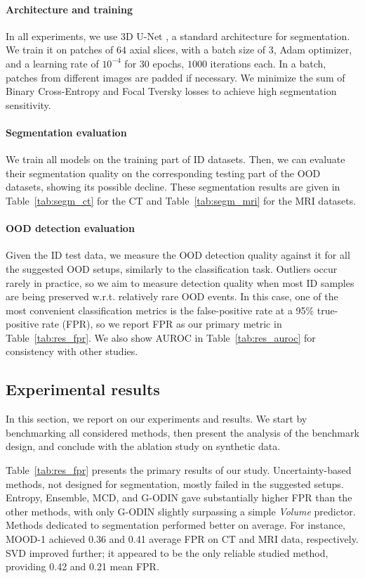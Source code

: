 \paragraph{Architecture and training} In all experiments, we use 3D U-Net \cite{isensee2018no}, a standard architecture for segmentation. We train it on patches of $64$ axial slices, with a batch size of $3$, Adam optimizer, and a learning rate of $10^{-4}$ for $30$ epochs, $1000$ iterations each. In a batch, patches from different images are padded if necessary. We minimize the sum of Binary Cross-Entropy and Focal Tversky losses \cite{abraham2019novel} to achieve high segmentation sensitivity.

\paragraph{Segmentation evaluation} We train all models on the training part of ID datasets. Then, we can evaluate their segmentation quality on the corresponding testing part of the OOD datasets, showing its possible decline. These segmentation results are given in Table~\ref{tab:segm_ct} for the CT and Table~\ref{tab:segm_mri} for the MRI datasets.

\paragraph{OOD detection evaluation} Given the ID test data, we measure the OOD detection quality against it for all the suggested OOD setups, similarly to the classification task. Outliers occur rarely in practice, so we aim to measure detection quality when most ID samples are being preserved w.r.t. relatively rare OOD events. In this case, one of the most convenient classification metrics is the false-positive rate at a 95\% true-positive rate (FPR), so we report FPR as our primary metric in Table~\ref{tab:res_fpr}. We also show AUROC in Table~\ref{tab:res_auroc} for consistency with other studies.


\subsection{Experimental results}

In this section, we report on our experiments and results. We start by benchmarking all considered methods, then present the analysis of the benchmark design, and conclude with the ablation study on synthetic data.

Table~\ref{tab:res_fpr} presents the primary results of our study. Uncertainty-based methods, not designed for segmentation, mostly failed in the suggested setups. Entropy, Ensemble, MCD, and G-ODIN gave substantially higher FPR than the other methods, with only G-ODIN slightly surpassing a simple \textit{Volume} predictor. Methods dedicated to segmentation performed better on average. For instance, MOOD-1 achieved 0.36 and 0.41 average FPR on CT and MRI data, respectively. SVD improved further; it appeared to be the only reliable studied method, providing 0.42 and 0.21 mean FPR.

